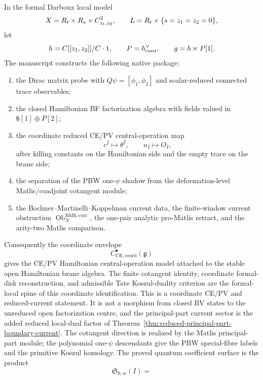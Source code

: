 \documentclass[11pt]{memoir}
\begin{document}
\begin{thm}\label{thm:main-local}
  In the formal Darboux local model
  \[
    X=R_t\times R_s\times C^2_{z_1,z_2},\qquad
    L=R_t\times\{s=z_1=z_2=0\},
  \]
  let
  \[
    h=C[[z_1,z_2]]/C\cdot1,\qquad
    P=h^\vee_{cont},\qquad
    g=h\ltimes P[1].
  \]
  The manuscript constructs the following native package:
  \begin{enumerate}
    \item the Dirac matrix probe with
      \(Q\psi=[\phi_1,\phi_2]\) and scalar-reduced connected trace
      observables;
    \item the closed Hamiltonian BF factorization algebra with fields
      valued in \(\mathfrak h[1]\oplus P[2]\);
    \item the coordinate reduced CE/PV central-operation map
      \[
        c^I\mapsto\theta^I,\qquad u_I\mapsto O_I,
      \]
      after killing constants on the Hamiltonian side and the empty trace
      on the brane side;
    \item the separation of the PBW one-\(\psi\) shadow from the
      deformation-level Matlis/coadjoint cotangent module;
    \item the Bochner--Martinelli--Koppelman current data, the
      finite-window current obstruction
      \(\operatorname{Ob}^{\mathrm{BMK\mbox{-}curr}}_N\), the
      one-pair analytic pro-Matlis retract, and the arity-two Matlis
      comparison.
  \end{enumerate}
  Consequently the coordinate envelope
  \[
    C^\bullet_{\mathrm{CE},\mathrm{coord}}(\mathfrak g)
  \]
  gives the CE/PV Hamiltonian central-operation model attached to the
  stable open Hamiltonian brane algebra.  The finite cotangent identity,
  coordinate formal-disk reconstruction, and admissible Tate
  Koszul-duality criterion are the formal-local spine of this coordinate
  identification.  This is a coordinate CE/PV and reduced-current
  statement.  It is not a morphism from closed BV states to the unreduced
  open factorization centre, and the principal-part current sector is the
  added reduced local-dual factor of
  Theorem~\ref{thm:reduced-principal-part-boundary-current}.  The cotangent
  direction is realized by the Matlis principal-part module; the
  polynomial one-\(\psi\) descendants give the PBW special-fibre labels
  and the primitive Koszul homology.  The proved quantum coefficient
  surface is
  the product
  \[
    \mathfrak S_{\hbar,w}(I)=
\]
\end{thm}
\end{document}
